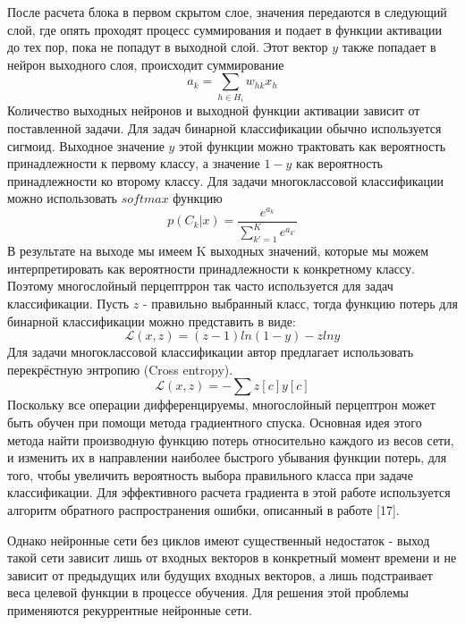     После расчета блока в первом скрытом слое, значения передаются в следующий слой, где опять проходят процесс суммирования и подает в функции активации до тех пор, пока не попадут в выходной слой. Этот вектор $y$ также попадает в нейрон выходного слоя, происходит суммирование
    \begin{equation}
    a_{k}=\sum_{h\in  H_{i}}w_{hk}x_{h}
    \end{equation}
    Количество выходных нейронов и выходной функции активации зависит от поставленной задачи. Для задач бинарной классификации обычно используется сигмоид. Выходное значение $y$ этой функции можно трактовать как вероятность принадлежности к первому классу, а значение $1-y$ как вероятность принадлежности ко второму классу.
    Для задачи многоклассовой классификации можно использовать $softmax$ функцию
    \begin{equation}
    p(C_{k}|x)=\frac{e^{a_{k}}}{\sum_{k{}'=1}^{K}e^{a_{k{}'}}}
    \end{equation}
    В результате на выходе мы имеем K выходных значений, которые мы можем интерпретировать как вероятности принадлежности к конкретному классу. Поэтому многослойный перцептррон так часто используется для задач классификации. Пусть $z$ - правильно выбранный класс, тогда функцию потерь для бинарной классификации можно представить в виде:
    \begin{equation}
    \mathcal{L}(x,z) = (z-1)ln(1-y)-zlny
    \end{equation}
    Для задачи многоклассовой классификации автор предлагает использовать перекрёстную энтропию (Cross entropy). %
    \begin{equation}
    \mathcal{L}(x,z) = -\sum{z[c] y[c]}
    \end{equation}
    Поскольку все операции дифференцируемы, многослойный перцептрон может быть обучен при помощи метода градиентного спуска. Основная идея этого метода найти производную функцию потерь относительно каждого из весов сети, и изменить их в направлении наиболее быстрого убывания функции потерь, для того, чтобы увеличить вероятность выбора правильного класса при задаче классификации. 
    Для эффективного расчета градиента в этой работе используется алгоритм обратного распространения ошибки, описанный в работе [17]. 

    Однако нейронные сети без циклов имеют существенный недостаток - выход такой сети зависит лишь от входных векторов в конкретный момент времени и не зависит от предыдущих или будущих входных векторов, а лишь подстраивает веса целевой функции в процессе обучения. Для решения этой проблемы применяются рекуррентные нейронные сети.

